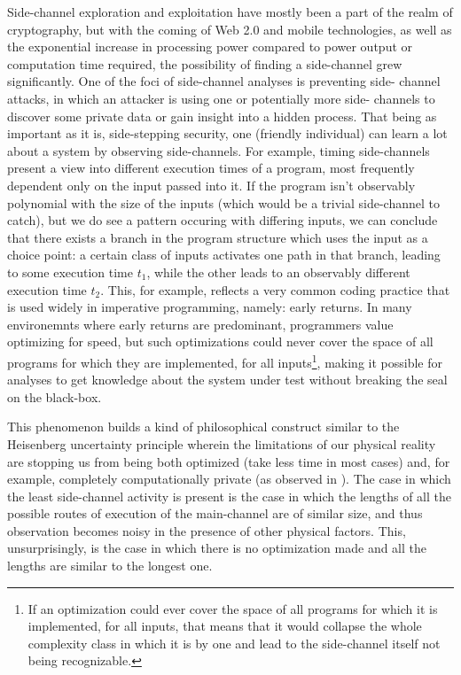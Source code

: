 \documentclass{article}
\begin{document}
Side-channel exploration and exploitation have mostly been a part of the realm
of cryptography, but with the coming of Web 2.0 and mobile technologies, as well
as the exponential increase in processing power compared to power output or
computation time required, the possibility of finding a side-channel grew
significantly. One of the foci of side-channel analyses is preventing side-
channel attacks, in which an attacker is using one or potentially more side-
channels to discover some private data or gain insight into a hidden process.
That being as important as it is, side-stepping security, one (friendly
individual) can learn a lot about a system by observing side-channels. For
example,  timing side-channels present a view into different execution times of
a program, most frequently dependent only on the input passed into it. If the
program isn't observably polynomial with the size of the inputs (which would be
a trivial side-channel to catch), but we do see a pattern occuring with
differing inputs, we can conclude that there exists a branch in the program
structure which uses the input as a choice point: a certain class of inputs
activates one path in that branch, leading to some execution time $t_1$, while
the other leads to an observably different execution time $t_2$. This, for
example, reflects a very common coding practice that is used widely in
imperative programming, namely: early returns. In many environemnts where early
returns are predominant,  programmers value optimizing for speed, but such
optimizations could never cover the space of all programs for which they are
implemented, for all inputs\footnote{If an optimization could ever cover the
space of all programs for which it is implemented, for all inputs, that means
that it  would collapse the whole complexity class in which it is by one and
lead to the side-channel  itself not being recognizable.}, making it possible
for analyses to get knowledge about the system under test without breaking the
seal on the black-box.

This phenomenon builds a kind of philosophical construct similar to the Heisenberg
uncertainty principle wherein the limitations of our physical reality are stopping
us from being both optimized (take less time in most cases) and, for example, 
completely computationally private (as observed in \cite{archlab-timing-14}). The
case in which the least side-channel activity is present is the case in which the 
lengths of all the possible routes of execution of the main-channel are of similar
size, and thus observation becomes noisy in the presence of other physical factors.
This, unsurprisingly, is the case in which there is no optimization made and all the
lengths are similar to the longest one.
\end{document}
